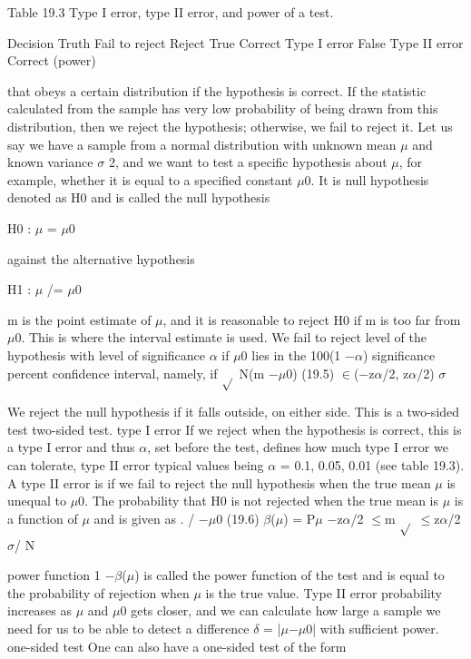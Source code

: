 Table 19.3 Type I error, type II error, and power of a test.

Decision Truth Fail to reject Reject True Correct Type I error False Type II error Correct (power)

that obeys a certain distribution if the hypothesis is correct. If the statistic calculated from the sample has very low probability of being drawn from this distribution, then we reject the hypothesis; otherwise, we fail to reject it. Let us say we have a sample from a normal distribution with unknown mean $\mu$ and known variance $\sigma$ 2, and we want to test a specific hypothesis about $\mu$, for example, whether it is equal to a specified constant $\mu$0. It is null hypothesis denoted as H0 and is called the null hypothesis

H0 : $\mu$ = $\mu$0

against the alternative hypothesis

H1 : $\mu$ /= $\mu$0

m is the point estimate of $\mu$, and it is reasonable to reject H0 if m is too far from $\mu$0. This is where the interval estimate is used. We fail to reject level of the hypothesis with level of significance $\alpha$ if $\mu$0 lies in the 100(1 $-$$\alpha$) significance percent confidence interval, namely, if $\sqrt{}$ N(m $-$$\mu$0) (19.5) $\in$($-$z$\alpha$/2, z$\alpha$/2) $\sigma$

We reject the null hypothesis if it falls outside, on either side. This is a two-sided test two-sided test. type I error If we reject when the hypothesis is correct, this is a type I error and thus $\alpha$, set before the test, defines how much type I error we can tolerate, type II error typical values being $\alpha$ = 0.1, 0.05, 0.01 (see table 19.3). A type II error is if we fail to reject the null hypothesis when the true mean $\mu$ is unequal to $\mu$0. The probability that H0 is not rejected when the true mean is $\mu$ is a function of $\mu$ and is given as . / $-$$\mu$0 (19.6) $\beta$($\mu$) = P$\mu$ $-$z$\alpha$/2 $\leq$m $\sqrt{}$ $\leq$z$\alpha$/2 $\sigma$/ N

power function 1 $-$$\beta$($\mu$) is called the power function of the test and is equal to the probability of rejection when $\mu$ is the true value. Type II error probability increases as $\mu$ and $\mu$0 gets closer, and we can calculate how large a sample we need for us to be able to detect a difference $\delta$ = |$\mu$$-$$\mu$0| with sufficient power. one-sided test One can also have a one-sided test of the form


